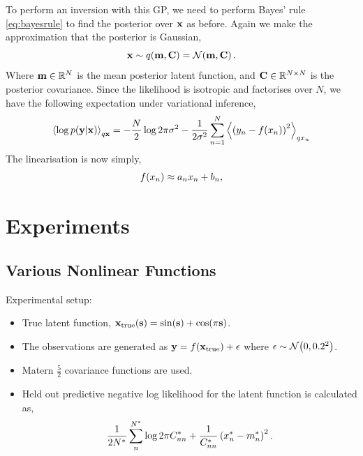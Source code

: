 \documentclass{article} %
\begin{document}
To perform an inversion with this GP, we need to perform Bayes' rule
\eqref{eq:bayesrule} to find the posterior over $\lstate$ as before. Again we
make the approximation that the posterior is Gaussian,
\begin{equation}
    \lstate \sim \qrob{\pomean, \pocov} = \gaus{\pomean, \pocov}.
\end{equation}
Where $\pomean \in \real{N}$ is the mean posterior latent function, and $\pocov
\in \real{N \times N}$ is the posterior covariance. Since the likelihood is
isotropic and factorises over $N$, we have the following expectation under
variational inference,
\begin{equation*}
    \expec{q\lstate}{\log\probC{\obs}{\lstate}} =
        - \frac{N}{2}\log{2\pi\lvar}
        - \frac{1}{2\lvar} \sum_{n=1}^N 
            \expec{q\lstates_n}{\brac{\obss_n - \nonlin{\lstates_n}}^2}
\end{equation*}
The linearisation is now simply,
\begin{equation}
    \nonlin{\lstates_n} \approx \Lins_n\lstates_n + \intcpts_n,
\end{equation}

\section{Experiments}


\subsection{Various Nonlinear Functions}
\label{sec:exptoy}

Experimental setup:
\begin{itemize}

    \item True latent function, $\lstate_{\text{true}}\!\brac{\inobs} =
        \sin\!\brac{\inobs} + \cos\!\brac{\pi\inobs}$.

    \item The observations are generated as $\obs =
        \nonlin{\lstate_\text{true}} + \epsilon$ where $\epsilon \sim \gaus{0,
            0.2^2}$.
    
    \item Matern $\frac{5}{2}$ covariance functions are used. 

    \item Held out predictive negative log likelihood for the latent function
        is calculated as,
        \begin{equation}
            \frac{1}{2N\test} \sum^{N\test}_n \log{2\pi\pocovs\test_{nn}}
                + \frac{1}{\pocovs\test_{nn}} \brac{\lstates\test_n -
                    \pomeans\test_n}^2.
        \end{equation}

\end{itemize}
\end{document}
